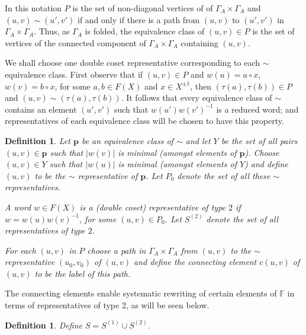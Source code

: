 \documentclass[a4paper,12pt]{article}
\newcommand{\G}{\Gamma }
\renewcommand{\t}{\tau }
\newcommand{\pp}{\mathbf{p}}
\newtheorem{definition}[theorem]{Definition}
\numberwithin{equation}{section}
\numberwithin{figure}{section}
\newcommand{\FF}{\ensuremath{\mathbb{F}}}
\begin{document}
In this notation $P$ is the set of non-diagonal vertices of  
 of $\G_A\times \G_A$ and   
$(u,v)\sim (u',v')$ if and only if there is 
a path from $(u,v)$ to $(u',v')$ in $\G_A\times \G_A$.
 Thus, as $\G_A$ is folded,  the equivalence class of $(u,v)\in P$
is the set of vertices of the connected component of $\G_A\times \G_A$ 
containing $(u,v)$. 

We shall choose one double coset representative corresponding to
each $\sim$ equivalence class. First observe that if
$(u,v)\in P$ and $w(u)=a\circ x$, $w(v)=b\circ x$, for some
$a,b\in F(X)$ and $x\in X^{\pm 1}$, then $(\t(a),\t(b))\in P$ and
$(u,v)\sim (\t(a),\t(b))$. It follows that every equivalence  class
of $\sim$ contains an element $(u',v')$ such that
$w(u')w(v')^{-1}$ is a reduced word; and representatives of each
equivalence class will be chosen to have this property. 

\begin{definition}
Let $\pp$ be an equivalence
class of $\sim$ and let $Y$ be the set of all pairs $(u,v)\in \pp$
such that $|w(v)|$ is minimal (amongst elements of $\pp$). Choose
$(u,v)\in Y$ such that $|w(u)|$ is minimal (amongst elements of
$Y$) and define $(u,v)$ to be the $\sim$ {\em representative} of
$\pp$. %
Let $P_0$ denote the set of  all these $\sim$ 
representatives.

A word $w\in F(X)$ is
 a {\em (double coset) representative of type} $2$ 
if $w=w(u)w(v)^{-1}$, for some $(u,v)\in P_0$.
Let $S^{(2)}$ denote the set of all representatives of type $2$.

For each $(u,v)$ in $P$ choose a path in $\G_A\times \G_A$ 
from $(u,v)$ to the $\sim$ representative
$(u_0,v_0)$ of $(u,v)$ and define the {\em connecting element}
$c(u,v)$  of $(u,v)$ to be the label of this path.  
\end{definition}
The  connecting elements enable systematic rewriting of certain
elements of $\FF$ in terms of representatives of type 2, as will be
seen below.
\begin{definition}
Define $S=S^{(1)}\cup S^{(2)}$. 
\end{definition}
\end{document}
